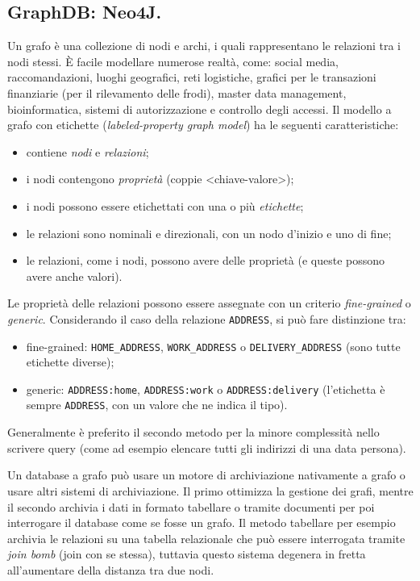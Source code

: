 \documentclass[a4page, 11pt]{article}
\begin{document}
\subsection{GraphDB: Neo4J\cite{GraphDB}.}
Un grafo è una collezione di nodi e archi, i quali rappresentano le relazioni tra i nodi stessi.
È facile modellare numerose realtà, come: social media, raccomandazioni, luoghi geografici, reti logistiche, grafici per le transazioni finanziarie (per il rilevamento delle frodi), master data management, bioinformatica, sistemi di autorizzazione e controllo degli accessi.
Il modello a grafo con etichette (\textit{labeled-property graph model}) ha le seguenti caratteristiche:
\begin{itemize}[noitemsep]
\item contiene \textit{nodi} e \textit{relazioni};
\item i nodi contengono \textit{proprietà} (coppie \textless{}chiave-valore\textgreater{});
\item i nodi possono essere etichettati con una o più \textit{etichette};
\item le relazioni sono nominali e direzionali, con un nodo d'inizio e uno di fine;
\item le relazioni, come i nodi, possono avere delle proprietà (e queste possono avere anche valori).
\end{itemize}
Le proprietà delle relazioni possono essere assegnate con un criterio \textit{fine-grained} o \textit{generic}.
Considerando il caso della relazione \verb|ADDRESS|, si può fare distinzione tra:
\begin{itemize}
\item fine-grained: \verb|HOME_ADDRESS|, \verb|WORK_ADDRESS| o \verb|DELIVERY_ADDRESS| (sono tutte etichette diverse);
\item generic: \verb|ADDRESS:home|, \verb|ADDRESS:work| o \verb|ADDRESS:delivery| (l'etichetta è sempre \verb|ADDRESS|, con un valore che ne indica il tipo).
\end{itemize}
Generalmente è preferito il secondo metodo per la minore complessità nello scrivere query (come ad esempio elencare tutti gli indirizzi di una data persona).

Un database a grafo può usare un motore di archiviazione nativamente a grafo o usare altri sistemi di archiviazione.
Il primo ottimizza la gestione dei grafi, mentre il secondo archivia i dati in formato tabellare o tramite documenti per poi interrogare il database come se fosse un grafo.
Il metodo tabellare per esempio archivia le relazioni su una tabella relazionale che può essere interrogata tramite \textit{join bomb} (join con se stessa), tuttavia questo sistema degenera in fretta all'aumentare della distanza tra due nodi.
\end{document}
